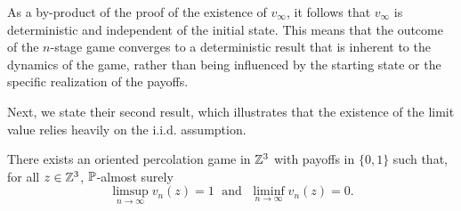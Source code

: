 
	\begin{remark} 
		As a by-product of the proof of the existence of $v_{\infty}$, it follows that $v_{\infty}$ is deterministic and independent of the initial state. This means that the outcome of the $n$-stage game converges to a deterministic result that is inherent to the dynamics of the game, rather than being influenced by the starting state or the specific realization of the payoffs.
	\end{remark}

	Next, we state their second result, which illustrates that the existence of the limit value relies heavily on the i.i.d. assumption.

	 \begin{theorem}
	 	There exists an oriented percolation game in $\mathbb{Z}^3$ with payoffs in $\{0,1\}$ such that, for all $z \in \mathbb{Z}^3$, $\mathbb{P}$-almost surely 
	 	\[
	 		\limsup_{n \to \infty}v_n(z) = 1 \; \text{ and } \; \liminf_{n \to \infty}v_n(z) = 0. 
	 	\]
	 \end{theorem}

